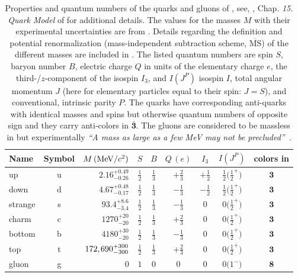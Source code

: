 \begin{table}[t]
	\centering
	\caption{\label{tab:quarksandgluons}%
		Properties and quantum numbers of the quarks and gluons of \qcd{}, see, \eg{}, Chap. \textit{15. Quark Model} of  for additional details.
		The values for the masses $M$ with their experimental uncertainties are from .
		Details regarding the definition and potential renormalization (mass-independent subtraction scheme, \viz{} ${\overline{\mathrm{MS}}}$) of the different masses are included in .
		The listed quantum numbers are spin $S$, baryon number $B$, electric charge $Q$ in units of the elementary charge $e$, the third-/$z$-component of the isospin $I_3$, and 
		$I(J^P)$ \dash{} isospin $I$, total angular momentum $J$ (here for elementary particles equal to their spin: $J=S$), and conventional, intrinsic parity $P$.
		The quarks have corresponding anti-quarks with identical masses and spins but otherwise quantum numbers of opposite sign and they carry anti-colors in $\bar{\mathbf{3}}$.
		The gluons are considered to be massless in \qcd{} but experimentally \textit{``A mass as large as a few MeV may not be precluded''}~\cite{ParticleDataGroup2022Aug,Yndurain1995Feb}.
	}%
	\vspace{\TableAbovecaptionskip}
	\renewcommand{\arraystretch}{1.15}
	\begin{tabular}{l c | r | c c c c c | c}
		\toprule
			Name & Symbol & $M\,(\mathrm{MeV}/c^2)$ & $S$ & $B$ & $Q\,(e)$ & $I_3$ & $I(J^P)$ & colors in\\
			\midrule
			up & u & $2.16_{-0.26}^{+0.49}$ & $\tfrac{1}{2}$ & $\tfrac{1}{3}$ & $+\tfrac{2}{3}$ & $+\tfrac{1}{2}$& $\tfrac{1}{2}\big(\tfrac{1}{2}^+\big)$ & $\mathbf{3}$\\[.1em]
			down & d & $4.67_{-0.17}^{+0.48}$ & $\tfrac{1}{2}$ & $\tfrac{1}{3}$ & $-\tfrac{1}{3}$ & $-\tfrac{1}{2}$ & $\tfrac{1}{2}\big(\tfrac{1}{2}^+\big)$ & $\mathbf{3}$\\[.3em]
			strange & s & $93.4_{-3.4}^{+8.6}$ & $\tfrac{1}{2}$ & $\tfrac{1}{3}$ & $-\tfrac{1}{3}$ & $0$ & $0\big(\tfrac{1}{2}^+\big)$ & $\mathbf{3}$\\[.1em]
			charm & c & $1270_{-20}^{+20}$ & $\tfrac{1}{2}$ & $\tfrac{1}{3}$ & $+\tfrac{2}{3}$ & $0$ & $0\big(\tfrac{1}{2}^+\big)$ & $\mathbf{3}$\\[.3em]
			bottom & b & $4180_{-20}^{+30}$ & $\tfrac{1}{2}$ & $\tfrac{1}{3}$ & $-\tfrac{1}{3}$ & $0$ & $0\big(\tfrac{1}{2}^+\big)$ & $\mathbf{3}$\\[.1em]
			top & t & $172,\mkern-1mu690_{-300}^{+300}	$ & $\tfrac{1}{2}$ & $\tfrac{1}{3}$ & $+\tfrac{2}{3}$ & $0$ & $0\big(\tfrac{1}{2}^+\big)$ & $\mathbf{3}$\\[.1em]
			\midrule
			gluon & g & $0$ & $1$ & $0$ & $0$ & $0$& $0\big(1^-\big)$ & $\mathbf{8}$\\
		\bottomrule
	\end{tabular}
\end{table}

